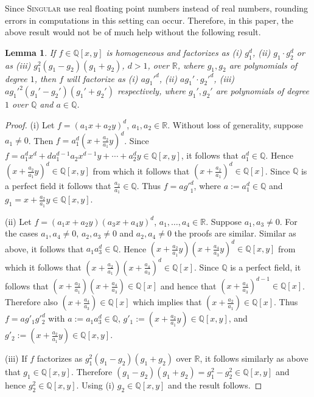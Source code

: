 \documentclass{amsproc}
\begin{document}
Since \textsc{Singular} use real floating point numbers instead of real numbers, rounding errors in computations in this setting can
occur. Therefore, in this paper, the above result would not be of much help without the
following result.
\newtheorem{x^3}[kjet]{Lemma}
\begin{x^3}\label{x^3}
If $f\in\mathbb Q[x,y]$ is homogeneous and factorizes as (i) $g_1^d$, (ii)
$g_1\cdot g_2^{d}$ or as  (iii) $g_1^2(g_1-g_2)(g_1+g_2)$, $d>1$, over
$\mathbb
R$, where $g_1,g_2$ are polynomials of degree $1$, then $f$ will factorize as
(i) $ag_1'^d$, (ii) $ag_1'\cdot g_2'^d$, (iii) $ag_1'^2(g_1'-g_2')(g_1'+g_2')$ respectively,
where $g_1', g_2'$ are polynomials of degree $1$ over $\mathbb Q$ and
$a\in\mathbb Q$.
\end{x^3}
\begin{proof}

(i) Let $f=(a_1x+a_2y)^d$, $a_1,a_2\in\mathbb R$. Without loss of generality,
suppose $a_1\neq 0$. Then $f=a_1^d(x+\frac{a_2}{a_1}y)^d$. Since $f=
a_1^dx^d+da_1^{d-1}a_2x^{d-1}y+\cdots+a_2^dy\in\mathbb Q[x,y]$, it follows
that $a_1^d\in\mathbb Q$. Hence $(x+\frac{a_2}{a_1}y)^d\in\mathbb Q[x,y]$
from which it follows that $(x+\frac{a_2}{a_1})^d\in\mathbb Q[x]$. Since
$\mathbb Q$ is a perfect field it follows that $\frac{a_2}{a_1}\in\mathbb
Q$. Thus $f=a{g'}_1^d$, where $a:=a_1^d\in\mathbb Q$ and
$g_1=x+\frac{a_2}{a_1}y\in\mathbb Q[x,y]$.

(ii) Let $f=(a_1x+a_2y)(a_3x+a_4y)^{d}$, $a_1,\ldots,a_4\in\mathbb
R$. Suppose $a_1,a_3\neq 0$.
For the cases $a_1,a_4\neq 0$, $a_2,a_3\neq 0$ and $a_2,a_4\neq 0$ the
proofs are similar.
Similar as above, it follows that $a_1a_3^{d}\in\mathbb Q$. Hence
$(x+\frac{a_2}{a_1}y)(x+\frac{a_4}{a_3}y)^d\in\mathbb Q[x,y]$ from which
it follows that $(x+\frac{a_2}{a_1})(x+\frac{a_4}{a_3})^d\in\mathbb
Q[x]$. Since $\mathbb Q$ is a perfect field, it follows that
$(x+\frac{a_2}{a_1})(x+\frac{a_4}{a_3})\in\mathbb Q[x]$ and
hence that $(x+\frac{a_4}{a_3})^{d-1}\in\mathbb Q[x]$. Therefore
also $(x+\frac{a_4}{a_3})\in\mathbb Q[x]$ which implies that
$(x+\frac{a_2}{a_1})\in\mathbb Q[x]$.
Thus $f=ag'_1g'^d_2$ with $a:=a_1a_3^d\in\mathbb Q$,
$g'_1:=(x+\frac{a_2}{a_1}y)\in\mathbb Q[x,y]$, and
$g'_2:=(x+\frac{a_2}{a_1}y)\in\mathbb Q[x,y]$.

(iii) If $f$ factorizes as $g_1^2(g_1-g_2)(g_1+g_2)$ over $\mathbb R$, it
follows similarly as above that $g_1\in\mathbb Q[x,y]$. Therefore
$(g_1-g_2)(g_1+g_2)=g_1^2-g_2^2\in\mathbb Q[x,y]$ and hence $g_2^2\in\mathbb
Q[x,y]$. Using (i) $g_2\in\mathbb Q[x,y]$ and the result follows.
\end{proof}
\end{document}
